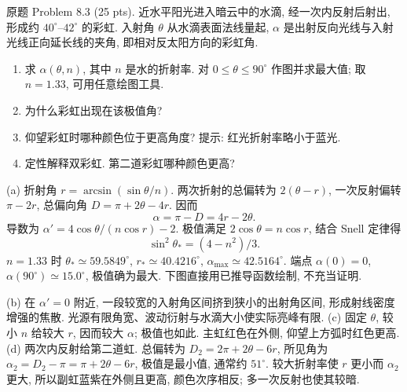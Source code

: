 \begin{exercise}\label{ps:8.3}
原题 Problem 8.3 (25 pts). 近水平阳光进入暗云中的水滴, 经一次内反射后射出, 形成约 $40^\circ$--$42^\circ$ 的彩虹. 入射角 $\theta$ 从水滴表面法线量起, $\alpha$ 是出射反向光线与入射光线正向延长线的夹角, 即相对反太阳方向的彩虹角.
\begin{enumerate}[label=\alph*.]
\item 求 $\alpha(\theta,n)$, 其中 $n$ 是水的折射率. 对 $0\le\theta\le90^\circ$ 作图并求最大值; 取 $n=1.33$, 可用任意绘图工具.
\item 为什么彩虹出现在该极值角?
\item 仰望彩虹时哪种颜色位于更高角度? 提示: 红光折射率略小于蓝光.
\item 定性解释双彩虹. 第二道彩虹哪种颜色更高?
\end{enumerate}
\end{exercise}
\begin{solution}
(a) 折射角 $r=\arcsin(\sin\theta/n)$. 两次折射的总偏转为 $2(\theta-r)$, 一次反射偏转 $\pi-2r$, 总偏向角 $D=\pi+2\theta-4r$. 因而
\[
\alpha=\pi-D=4r-2\theta.
\]
导数为 $\alpha'=4\cos\theta/(n\cos r)-2$. 极值满足 $2\cos\theta=n\cos r$, 结合 Snell 定律得
\[
\sin^2\theta_*=(4-n^2)/3.
\]
$n=1.33$ 时 $\theta_*\simeq59.5849^\circ$, $r_*\simeq40.4216^\circ$, $\alpha_{\max}\simeq42.5164^\circ$. 端点 $\alpha(0)=0$, $\alpha(90^\circ)\simeq15.0^\circ$, 极值确为最大. 下图直接用已推导函数绘制, 不充当证明.
\begin{center}\end{center}
(b) 在 $\alpha'=0$ 附近, 一段较宽的入射角区间挤到狭小的出射角区间, 形成射线密度增强的焦散. 光源有限角宽、波动衍射与水滴大小使实际亮峰有限.
(c) 固定 $\theta$, 较小 $n$ 给较大 $r$, 因而较大 $\alpha$; 极值也如此. 主虹红色在外侧, 仰望上方弧时红色更高.
(d) 两次内反射给第二道虹. 总偏转为 $D_2=2\pi+2\theta-6r$, 所见角为 $\alpha_2=D_2-\pi=\pi+2\theta-6r$, 极值是最小值, 通常约 $51^\circ$. 较大折射率使 $r$ 更小而 $\alpha_2$ 更大, 所以副虹蓝紫在外侧且更高, 颜色次序相反; 多一次反射也使其较暗.
\end{solution}

